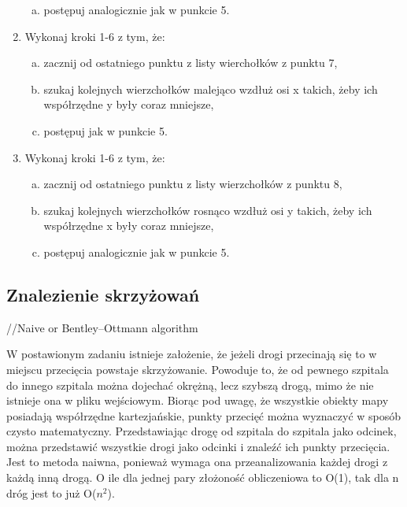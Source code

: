 \documentclass[10pt,a4paper]{article}
\begin{document}
\begin{enumerate}
\begin{enumerate}[a)]
        \item postępuj analogicznie jak w punkcie 5.
    \end{enumerate}
    \item Wykonaj kroki 1-6 z tym, że:
    \begin{enumerate}[a)]
        \item zacznij od ostatniego punktu z listy wierchołków z punktu 7,
        \item szukaj kolejnych wierzchołków malejąco wzdłuż osi x takich, żeby ich współrzędne y były coraz mniejsze,
        \item postępuj jak w punkcie 5.
    \end{enumerate}
    \item Wykonaj kroki 1-6 z tym, że:
    \begin{enumerate}[a)]
        \item zacznij od ostatniego punktu z listy wierzchołków z punktu 8,
        \item szukaj kolejnych wierzchołków rosnąco wzdłuż osi y takich, żeby ich współrzędne x były coraz mniejsze,
        \item postępuj analogicznie jak w punkcie 5.
    \end{enumerate}
\end{enumerate}

\subsection{Znalezienie skrzyżowań}

//Naive or Bentley–Ottmann algorithm


W postawionym zadaniu istnieje założenie, że jeżeli drogi przecinają się to w miejscu przecięcia powstaje skrzyżowanie.
Powoduje to, że od pewnego szpitala do innego szpitala można dojechać okrężną, lecz szybszą drogą, mimo że nie istnieje ona w pliku wejściowym.
Biorąc pod uwagę, że wszystkie obiekty mapy posiadają współrzędne kartezjańskie, punkty przecięć można wyznaczyć w sposób czysto matematyczny.
Przedstawiając drogę od szpitala do szpitala jako odcinek, można przedstawić wszystkie drogi jako odcinki i znaleźć ich punkty przecięcia.
Jest to metoda naiwna, ponieważ wymaga ona przeanalizowania każdej drogi z każdą inną drogą.
O ile dla jednej pary złożoność obliczeniowa to O(1), tak dla n dróg jest to już O($n^2$).
\end{document}
